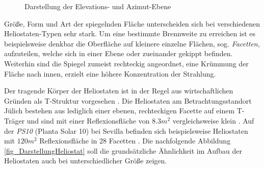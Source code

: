 \begin{figure}[h!]
    \centering
    \setlength{\fboxsep}{1pt}
    \setlength{\fboxrule}{1pt}
\caption[Darstellung der Elevations- und Azimut-Ebene]{Darstellung der Elevations- und Azimut-Ebene \cite[S.6]{DissZanger}}
    \label{fig_FreiheitsgradeHeliostat}
\end{figure}

Größe, Form und Art der spiegelnden Fläche unterscheiden sich bei verschiedenen Heliostaten-Typen sehr stark.
Um eine bestimmte Brennweite zu erreichen ist es beispielsweise denkbar die Oberfläche auf kleinere einzelne Flächen, sog. \textit{Facetten}, aufzuteilen, welche sich in einer Ebene oder zueinander gekippt befinden.
Weiterhin sind die Spiegel zumeist rechteckig angeordnet, eine Krümmung der Fläche nach innen, erzielt eine höhere Konzentration der Strahlung. \cite[S.5]{DissZanger}

Der tragende Körper der Heliostaten ist in der Regel aus wirtschaftlichen Gründen als T-Struktur vorgesehen \cite[S.97]{ScottAJones}.
Die Heliostaten am Betrachtungsstandort Jülich bestehen aus lediglich einer ebenen, rechteckigen Facette auf einem T-Träger und sind mit einer Reflexionsfläche von $8.3m^2$ vergleichsweise klein \cite[S.4]{DissGall}\cite[S.13]{DissBelhomme}.
Auf der \textit{PS10} (Planta Solar 10) bei Sevilla befinden sich beispielsweise Heliostaten mit $120m^2$ Reflexionsfläche in 28 Facetten \cite[S.5]{ManuelSilva}.
Die nachfolgende Abbildung \ref{fig_DarstellungHeliostat} soll die grundsätzliche Ähnlichkeit im Aufbau der Heliostaten auch bei unterschiedlicher Größe zeigen.

